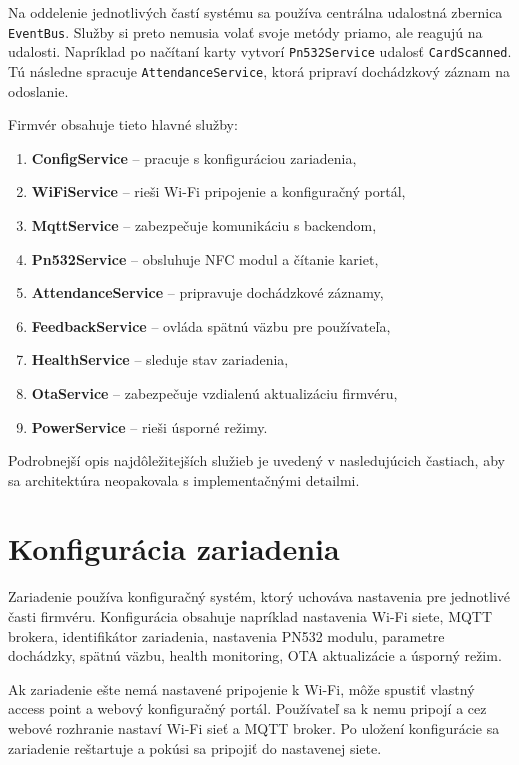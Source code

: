 Na oddelenie jednotlivých častí systému sa používa centrálna udalostná zbernica \texttt{EventBus}. Služby si preto nemusia volať svoje metódy priamo, ale reagujú na udalosti. Napríklad po načítaní karty vytvorí \texttt{Pn532Service} udalosť \texttt{CardScanned}. Tú následne spracuje \texttt{AttendanceService}, ktorá pripraví dochádzkový záznam na odoslanie.

Firmvér obsahuje tieto hlavné služby:
\begin{enumerate}
    \item \textbf{ConfigService} -- pracuje s konfiguráciou zariadenia,
    \item \textbf{WiFiService} -- rieši Wi-Fi pripojenie a konfiguračný portál,
    \item \textbf{MqttService} -- zabezpečuje komunikáciu s backendom,
    \item \textbf{Pn532Service} -- obsluhuje NFC modul a čítanie kariet,
    \item \textbf{AttendanceService} -- pripravuje dochádzkové záznamy,
    \item \textbf{FeedbackService} -- ovláda spätnú väzbu pre používateľa,
    \item \textbf{HealthService} -- sleduje stav zariadenia,
    \item \textbf{OtaService} -- zabezpečuje vzdialenú aktualizáciu firmvéru,
    \item \textbf{PowerService} -- rieši úsporné režimy.
\end{enumerate}

Podrobnejší opis najdôležitejších služieb je uvedený v nasledujúcich častiach, aby sa architektúra neopakovala s implementačnými detailmi.

\section{Konfigurácia zariadenia}
\label{subsec:hardware-configuration}

Zariadenie používa konfiguračný systém, ktorý uchováva nastavenia pre jednotlivé časti firmvéru. Konfigurácia obsahuje napríklad nastavenia Wi-Fi siete, MQTT brokera, identifikátor zariadenia, nastavenia PN532 modulu, parametre dochádzky, spätnú väzbu, health monitoring, OTA aktualizácie a úsporný režim.

Ak zariadenie ešte nemá nastavené pripojenie k Wi-Fi, môže spustiť vlastný access point a webový konfiguračný portál. Používateľ sa k nemu pripojí a cez webové rozhranie nastaví Wi-Fi sieť a MQTT broker. Po uložení konfigurácie sa zariadenie reštartuje a pokúsi sa pripojiť do nastavenej siete.

